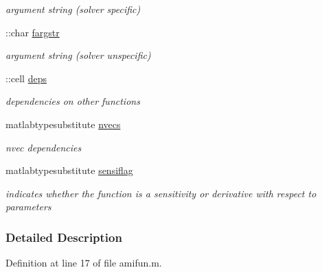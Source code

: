 \begin{DoxyCompactItemize}
\begin{DoxyCompactList}\small\item\em argument string (solver specific) \end{DoxyCompactList}\item 
\hypertarget{classamifun_acdb54dfb4e0a737dba0367c5958e779e}{}\+::char \hyperlink{classamifun_acdb54dfb4e0a737dba0367c5958e779e}{fargstr}\label{classamifun_acdb54dfb4e0a737dba0367c5958e779e}

\begin{DoxyCompactList}\small\item\em argument string (solver unspecific) \end{DoxyCompactList}\item 
\hypertarget{classamifun_a69ffe5c24686ceb79ed44399e6be556c}{}\+::cell \hyperlink{classamifun_a69ffe5c24686ceb79ed44399e6be556c}{deps}\label{classamifun_a69ffe5c24686ceb79ed44399e6be556c}

\begin{DoxyCompactList}\small\item\em dependencies on other functions \end{DoxyCompactList}\item 
\hypertarget{classamifun_a019d960f3d1c1c819a7f3fc90f952c4b}{}matlabtypesubstitute \hyperlink{classamifun_a019d960f3d1c1c819a7f3fc90f952c4b}{nvecs}\label{classamifun_a019d960f3d1c1c819a7f3fc90f952c4b}

\begin{DoxyCompactList}\small\item\em nvec dependencies \end{DoxyCompactList}\item 
\hypertarget{classamifun_ad8930a02bca1d5facc6203b722d5349d}{}matlabtypesubstitute \hyperlink{classamifun_ad8930a02bca1d5facc6203b722d5349d}{sensiflag}\label{classamifun_ad8930a02bca1d5facc6203b722d5349d}

\begin{DoxyCompactList}\small\item\em indicates whether the function is a sensitivity or derivative with respect to parameters \end{DoxyCompactList}\end{DoxyCompactItemize}


\subsubsection{Detailed Description}


Definition at line 17 of file amifun.\+m.



